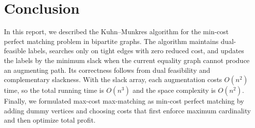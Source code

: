 \documentclass[acmsmall,nonacm]{acmart}
\theoremstyle{plain}
\theoremstyle{remark}
\begin{document}
\section{Conclusion}
\label{sec:conclusion}

In this report, we described the Kuhn--Munkres algorithm for the min-cost
perfect matching problem in bipartite graphs. The algorithm maintains
dual-feasible labels, searches only on tight edges with zero reduced cost, and
updates the labels by the minimum slack when the current equality graph cannot
produce an augmenting path. Its correctness follows from dual feasibility and
complementary slackness. With the slack array, each augmentation costs
$O(n^2)$ time, so the total running time is $O(n^3)$ and the space complexity is
$O(n^2)$. Finally, we formulated max-cost max-matching as min-cost perfect
matching by adding dummy vertices and choosing costs that first enforce maximum
cardinality and then optimize total profit.
\end{document}
